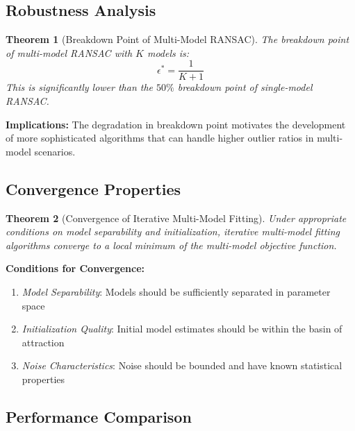 \documentclass[12pt]{article}
\newtheorem{theorem}{Theorem}[section]
\begin{document}
\subsection{Robustness Analysis}
\label{subsec:robustness_analysis}

\begin{theorem}[Breakdown Point of Multi-Model RANSAC]
    \label{thm:multimodel_breakdown}
    The breakdown point of multi-model RANSAC with $K$ models is:
    \begin{equation}
        \epsilon^* = \frac{1}{K+1}
        \label{eq:multimodel_breakdown}
    \end{equation}
    This is significantly lower than the $50\%$ breakdown point of single-model RANSAC.
\end{theorem}

\textbf{Implications:} The degradation in breakdown point motivates the development of more sophisticated algorithms that can handle higher outlier ratios in multi-model scenarios.

\subsection{Convergence Properties}
\label{subsec:convergence_properties}

\begin{theorem}[Convergence of Iterative Multi-Model Fitting]
    \label{thm:convergence_iterative}
    Under appropriate conditions on model separability and initialization, iterative multi-model fitting algorithms converge to a local minimum of the multi-model objective function.
\end{theorem}

\textbf{Conditions for Convergence:}
\begin{enumerate}
    \item \textit{Model Separability}: Models should be sufficiently separated in parameter space
    \item \textit{Initialization Quality}: Initial model estimates should be within the basin of attraction
    \item \textit{Noise Characteristics}: Noise should be bounded and have known statistical properties
\end{enumerate}

\subsection{Performance Comparison}
\label{subsec:performance_comparison}
\end{document}
